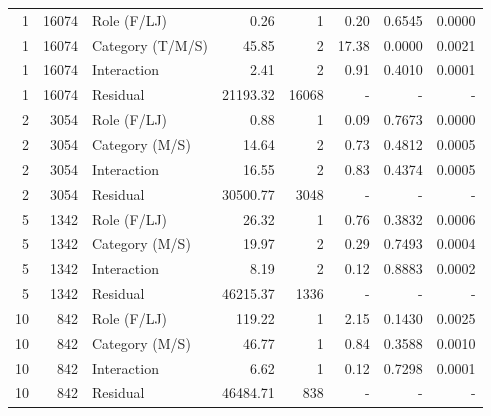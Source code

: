 \begin{table}[H]
\begin{tabular}{r r l r r r r r}
\midrule
1 & 16074 & Role (F/LJ) & 0.26 & 1 & 0.20 & 0.6545 & 0.0000 \\ 
1 & 16074 & Category (T/M/S) & 45.85 & 2 & 17.38 & 0.0000 & 0.0021 \\ 
1 & 16074 & Interaction & 2.41 & 2 & 0.91 & 0.4010 & 0.0001 \\ 
1 & 16074 & Residual & 21193.32 & 16068 & - & - & -   \\ 
2 & 3054 & Role (F/LJ) & 0.88 & 1 & 0.09 & 0.7673 & 0.0000 \\ 
2 & 3054 & Category (M/S) & 14.64 & 2 & 0.73 & 0.4812 & 0.0005 \\ 
2 & 3054 & Interaction & 16.55 & 2 & 0.83 & 0.4374 & 0.0005 \\ 
2 & 3054 & Residual & 30500.77 & 3048 & - & - & -   \\ 
5 & 1342 & Role (F/LJ) & 26.32 & 1 & 0.76 & 0.3832 & 0.0006 \\ 
5 & 1342 & Category (M/S) & 19.97 & 2 & 0.29 & 0.7493 & 0.0004 \\ 
5 & 1342 & Interaction & 8.19 & 2 & 0.12 & 0.8883 & 0.0002 \\ 
5 & 1342 & Residual & 46215.37 & 1336 & - & - & -   \\ 
10 & 842 & Role (F/LJ) & 119.22 & 1 & 2.15 & 0.1430 & 0.0025 \\ 
10 & 842 & Category (M/S) & 46.77 & 1 & 0.84 & 0.3588 & 0.0010 \\ 
10 & 842 & Interaction & 6.62 & 1 & 0.12 & 0.7298 & 0.0001 \\ 
10 & 842 & Residual & 46484.71 & 838 & - & - & -   \\ 
\bottomrule
\end{tabular}%
\label{tab:standard_anova_packages} 
\end{table}
\newpage 
